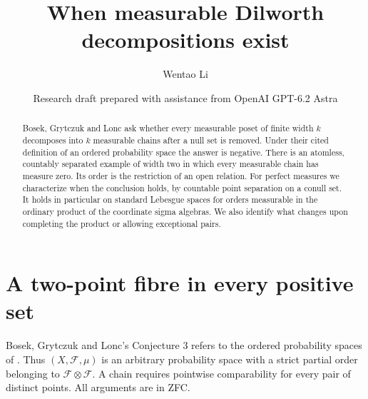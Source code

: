 \documentclass[11pt]{article}
\title{When measurable Dilworth decompositions exist}
\author{Wentao Li}
\date{Research draft prepared with assistance from OpenAI GPT-6.2 Astra}
\begin{document}
\maketitle
\begin{abstract}
Bosek, Grytczuk and Lonc ask whether every measurable poset of finite width $k$ decomposes into $k$ measurable chains after a null set is removed. Under their cited definition of an ordered probability space the answer is negative. There is an atomless, countably separated example of width two in which every measurable chain has measure zero. Its order is the restriction of an open relation. For perfect measures we characterize when the conclusion holds, by countable point separation on a conull set. It holds in particular on standard Lebesgue spaces for orders measurable in the ordinary product of the coordinate sigma algebras. We also identify what changes upon completing the product or allowing exceptional pairs.
\end{abstract}
\section{A two-point fibre in every positive set}
Bosek, Grytczuk and Lonc's Conjecture 3 \cite{bgl} refers to the ordered probability spaces of \cite[Definition 1.3]{ordered}. Thus $(X,\mathcal F,\mu)$ is an arbitrary probability space with a strict partial order belonging to $\mathcal F\otimes\mathcal F$. A chain requires pointwise comparability for every pair of distinct points. All arguments are in ZFC.
\end{document}

